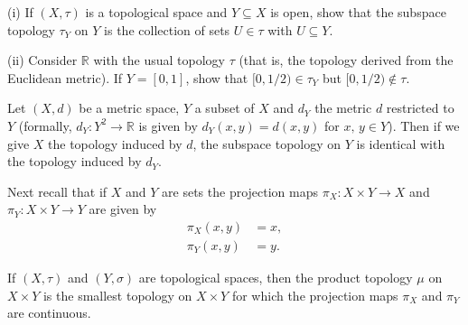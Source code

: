 \begin{exercise} 
(i) If $(X,\tau)$ is a topological space
and $Y\subseteq X$ is open, 
show that the subspace topology $\tau_{Y}$ on $Y$
is the collection of sets $U\in\tau$ with $U\subseteq Y$.

(ii) Consider ${\mathbb R}$ with the usual topology $\tau$
(that is, the topology derived from the Euclidean metric).
If $Y=[0,1]$, show that $[0,1/2)\in\tau_{Y}$ but $[0,1/2)\notin\tau$.
\end{exercise}
\begin{exercise}
Let $(X,d)$ be a metric space, $Y$ a subset
of $X$ and $d_{Y}$ the metric $d$ restricted to $Y$
(formally, $d_{Y}:Y^{2}\rightarrow{\mathbb R}$ is given by 
$d_{Y}(x,y)=d(x,y)$ for $x,\,y\in Y$). Then if we
give $X$ the topology induced by $d$, the subspace
topology on $Y$ is identical with the topology induced by $d_{Y}$.

\end{exercise}
Next recall that if $X$ and $Y$ are sets
the projection maps $\pi_{X}:X\times Y\rightarrow X$ and
$\pi_{Y}:X\times Y\rightarrow Y$
are given by
\begin{align*}
\pi_{X}(x,y)&=x,\\
\pi_{Y}(x,y)&=y.
\end{align*}

\begin{definition}\label{D;product topology} 
If $(X,\tau)$ and $(Y,\sigma)$
are topological spaces, then the product topology
$\mu$ on $X\times Y$ is
the smallest topology on $X\times Y$ for which the
projection maps $\pi_{X}$ and $\pi_{Y}$ are continuous.
\end{definition}



